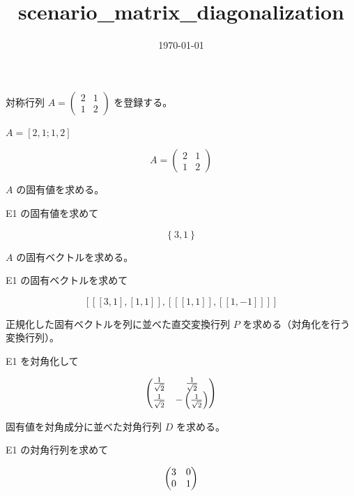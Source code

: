 \documentclass[dvipdfmx,a4paper,11pt]{jsarticle}
\title{scenario\_matrix\_diagonalization}
\date{\today}
\begin{document}
\maketitle

対称行列 $A=\begin{pmatrix}2&1\\1&2\end{pmatrix}$ を登録する。

$A = [2, 1; 1, 2]$

\begin{equation}
  A = \begin{pmatrix} 2 & 1 \\ 1 & 2 \end{pmatrix}
  \label{eq:E1}
\end{equation}

$A$ の固有値を求める。

E1 の固有値を求めて

\begin{equation}
  \left\{ 3 , 1 \right\}
  \label{eq:E2}
\end{equation}

$A$ の固有ベクトルを求める。

E1 の固有ベクトルを求めて

\begin{equation}
  \left[ \left[ \left[ 3 , 1 \right]  , \left[ 1 , 1 \right]  \right]  , \left[ \left[ \left[ 1 , 1 \right]  \right]  , \left[ \left[ 1 , -1 \right]  \right]  \right]  \right]
  \label{eq:E3}
\end{equation}

正規化した固有ベクトルを列に並べた直交変換行列 $P$ を求める（対角化を行う変換行列）。

E1 を対角化して

\begin{equation}
  \ifx\endpmatrix\undefined\pmatrix{\else\begin{pmatrix}\fi \frac{1}{\sqrt{2}}&\frac{1}{\sqrt{2}}\cr \frac{1}{\sqrt{2}}&-\left(\frac{1}{\sqrt{2}}\right)\cr \ifx\endpmatrix\undefined}\else\end{pmatrix}\fi
  \label{eq:E4}
\end{equation}

固有値を対角成分に並べた対角行列 $D$ を求める。

E1 の対角行列を求めて

\begin{equation}
  \ifx\endpmatrix\undefined\pmatrix{\else\begin{pmatrix}\fi 3&0\cr 0&1\cr \ifx\endpmatrix\undefined}\else\end{pmatrix}\fi
  \label{eq:E5}
\end{equation}
\end{document}
